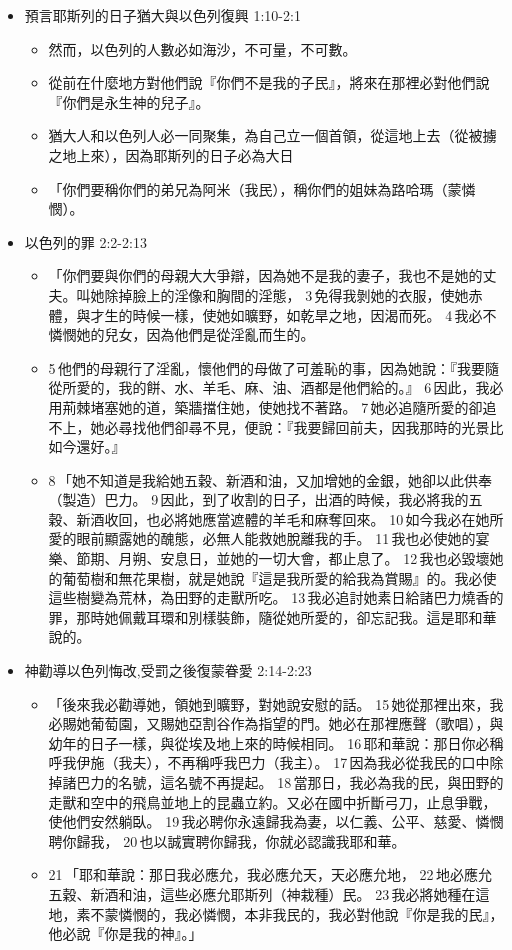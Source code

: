 \begin{itemize}
\itemsep-.45em  
\item 預言耶斯列的日子猶大與以色列復興 1:10-2:1
\begin{itemize}
\itemsep-.45em  
\item 然而，以色列的人數必如海沙，不可量，不可數。
\item 從前在什麼地方對他們說『你們不是我的子民』，將來在那裡必對他們說『你們是永生神的兒子』。 
\item 猶大人和以色列人必一同聚集，為自己立一個首領，從這地上去（從被擄之地上來），因為耶斯列的日子必為大日
\item 「你們要稱你們的弟兄為阿米（我民），稱你們的姐妹為路哈瑪（蒙憐憫）。
\end{itemize}
\item 以色列的罪 2:2-2:13
\begin{itemize}
\itemsep-.45em  
\item 「你們要與你們的母親大大爭辯，因為她不是我的妻子，我也不是她的丈夫。叫她除掉臉上的淫像和胸間的淫態， 3 免得我剝她的衣服，使她赤體，與才生的時候一樣，使她如曠野，如乾旱之地，因渴而死。 4 我必不憐憫她的兒女，因為他們是從淫亂而生的。 
\item 5 他們的母親行了淫亂，懷他們的母做了可羞恥的事，因為她說：『我要隨從所愛的，我的餅、水、羊毛、麻、油、酒都是他們給的。』 6 因此，我必用荊棘堵塞她的道，築牆擋住她，使她找不著路。 7 她必追隨所愛的卻追不上，她必尋找他們卻尋不見，便說：『我要歸回前夫，因我那時的光景比如今還好。』
\item 8 「她不知道是我給她五穀、新酒和油，又加增她的金銀，她卻以此供奉（製造）巴力。 9 因此，到了收割的日子，出酒的時候，我必將我的五穀、新酒收回，也必將她應當遮體的羊毛和麻奪回來。 10 如今我必在她所愛的眼前顯露她的醜態，必無人能救她脫離我的手。 11 我也必使她的宴樂、節期、月朔、安息日，並她的一切大會，都止息了。 12 我也必毀壞她的葡萄樹和無花果樹，就是她說『這是我所愛的給我為賞賜』的。我必使這些樹變為荒林，為田野的走獸所吃。 13 我必追討她素日給諸巴力燒香的罪，那時她佩戴耳環和別樣裝飾，隨從她所愛的，卻忘記我。這是耶和華說的。
\end{itemize}
\item 神勸導以色列悔改,受罰之後復蒙眷愛 2:14-2:23
\begin{itemize}
\itemsep-.45em  
\item 「後來我必勸導她，領她到曠野，對她說安慰的話。 15 她從那裡出來，我必賜她葡萄園，又賜她亞割谷作為指望的門。她必在那裡應聲（歌唱），與幼年的日子一樣，與從埃及地上來的時候相同。 16 耶和華說：那日你必稱呼我伊施（我夫），不再稱呼我巴力（我主）。 17 因為我必從我民的口中除掉諸巴力的名號，這名號不再提起。 18 當那日，我必為我的民，與田野的走獸和空中的飛鳥並地上的昆蟲立約。又必在國中折斷弓刀，止息爭戰，使他們安然躺臥。 19 我必聘你永遠歸我為妻，以仁義、公平、慈愛、憐憫聘你歸我， 20 也以誠實聘你歸我，你就必認識我耶和華。

\item 21 「耶和華說：那日我必應允，我必應允天，天必應允地， 22 地必應允五穀、新酒和油，這些必應允耶斯列（神栽種）民。 23 我必將她種在這地，素不蒙憐憫的，我必憐憫，本非我民的，我必對他說『你是我的民』，他必說『你是我的神』。」
\end{itemize}
\end{itemize}

